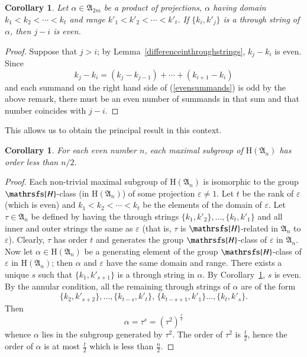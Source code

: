 \documentclass[preprint,1p,times]{elsarticle}
\numberwithin{equation}{section}
\newtheorem{Cor}[Thm]{Corollary}
\theoremstyle{remark}
\def\Hc{\mathrsfs{H}}
\def\al{\alpha}
\def\ep{\varepsilon}
\def\H{\mathrm H}
\def\A{\mathfrak{A}}
\begin{document}
\begin{Cor}\label{differenceinindices}
Let $\al\in\A_{2m}$ be a product of projections, $\al$ having domain $k_1<k_2<\cdots<k_t$ and range
$k'_1<k'_2<\cdots<k'_t$. If $\{k_i,k'_j\}$ is a through string of $\al$, then $j-i$ is even.
\end{Cor}

\begin{proof}
Suppose that $j>i$; by Lemma~\ref{differenceinthroughstrings}, $k_j-k_i$ is even. Since
\begin{equation}\label{evensummands}
k_j-k_i=(k_j-k_{j-1})+\cdots+(k_{i+1}-k_i)
\end{equation}
and each summand on the right hand side of (\ref{evensummands}) is odd by the above remark, there must be an even
number of summands in that sum and that number coincides with $j-i$.
\end{proof}

This allows us to obtain the principal result in this context.

\begin{Cor} \label{maximalsubgroups}
For each even number $n$, each maximal subgroup of $\H(\A_n)$ has order less than $n/2$.
\end{Cor}

\begin{proof}
Each non-trivial maximal subgroup of $\H(\A_n)$ is isomorphic to the group $\Hc$-class (in $\H(\A_n)$) of some
projection $\ep\ne 1$. Let $t$ be the rank of $\ep$ (which is even) and $k_1<k_2<\cdots<k_t$ be the elements of the
domain of $\ep$. Let $\tau\in \A_n$ be defined by having the through strings $\{k_1,k'_2\}, \dots,\{k_t,k'_1\}$ and all
inner and outer strings the same as $\ep$ (that is, $\tau$ is $\Hc$-related in $\A_n$ to $\ep$). Clearly, $\tau$ has
order $t$ and generates the group $\Hc$-class of $\ep$ in $\A_n$. Now let $\al\in \H(\A_n)$ be a generating element of
the group $\Hc$-class of $\ep$ in $\H(\A_n)$; then $\al$ and $\ep$ have the same domain and range. There exists a
unique $s$ such that $\{k_1,k'_{s+1}\}$ is a through string in $\al$. By Corollary~\ref{differenceinindices}, $s$ is
even. By the annular condition, all the remaining through strings of $\al$ are of the form
$$\{k_2,k'_{s+2}\},\dots,\{k_{t-s},k'_t\},\,\{k_{t-s+1},k'_1\}\dots,
\{k_t,k'_s\}.$$ Then
$$\al=\tau^s=(\tau^2)^{\frac s 2}$$ whence $\al$ lies in the
subgroup generated by $\tau^2$. The order of $\tau^2$ is $\frac t 2$, hence the order of $\al$ is at most $\frac t2$
which is less than $\frac n 2$.
\end{proof}
\end{document}
